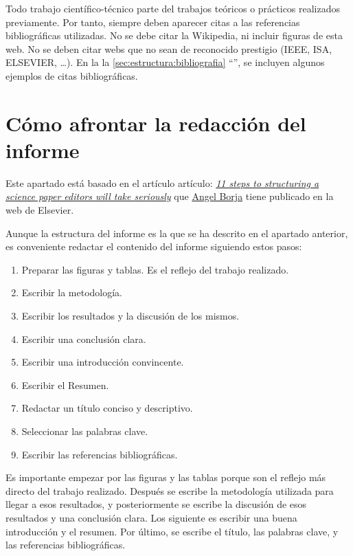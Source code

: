 \documentclass[11pt]{article}
\begin{document}
Todo trabajo científico-técnico parte del trabajos teóricos o prácticos realizados previamente. Por tanto, siempre deben aparecer citas a las referencias bibliográficas utilizadas. No se debe citar la Wikipedia, ni incluir figuras de esta web. No se deben citar webs que no sean de reconocido prestigio (IEEE, ISA, ELSEVIER, …). En la la \autoref{sec:estructura:bibliografia} ``'', se incluyen algunos ejemplos de citas bibliográficas.



\section{Cómo afrontar la redacción del informe}
\label{sec:redaccion}

Este apartado está basado en el artículo artículo: \href{https://www.elsevier.com/connect/11-steps-to-structuring-a-science-paper-editors-will-take-seriously}{\itshape 11 steps to structuring a science paper editors will take seriously} que \href{https://www.linkedin.com/in/angel-borja-yerro-1320b76a/?originalSubdomain=es}{Angel Borja} tiene publicado en la web de Elsevier.

Aunque la estructura del informe es la que se ha descrito en el apartado anterior, es conveniente redactar el contenido del informe siguiendo estos pasos:

\begin{enumerate} \itemsep = 0ex %
    \item Preparar las figuras y tablas. Es el reflejo del trabajo realizado.
    \item Escribir la metodología.
    \item Escribir los resultados y la discusión de los mismos.
    \item Escribir una conclusión clara.
    \item Escribir una introducción convincente.
    \item Escribir el Resumen.
    \item Redactar un título conciso y descriptivo.
    \item Seleccionar las palabras clave.
    \item Escribir las referencias bibliográficas.
\end{enumerate}


Es importante empezar por las figuras y las tablas porque son el reflejo más directo del trabajo realizado. Después se escribe la metodología utilizada para llegar a esos resultados, y posteriormente se escribe la discusión de esos resultados y una conclusión clara. Los siguiente es escribir una buena introducción y el resumen. Por último, se escribe el título, las palabras clave, y las referencias bibliográficas.
\end{document}
